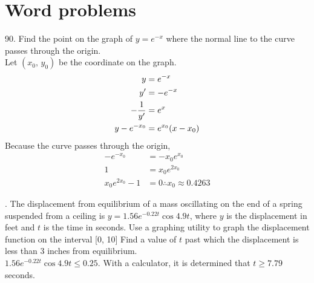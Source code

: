 \documentclass[11pt]{article}
\newcommand*{\vs}{\vspace{1cm}}
\newcommand*{\next}{\noindent}
\newcommand*{\set}{\setcounter{equation}{0}}
\newcommand*{\s}{\section}
\begin{document}
\s{Word problems}
90. Find the point on the graph of $y=e^{-x}$ where the normal line to
the curve passes through the origin.\\
\indent Let $(x_0,\, y_0)$ be the coordinate on the graph.
\begin{align}
    \set
    y&=e^{-x}\\
    y'&=-e^{-x}\\
    -\frac{1}{y'}&=e^x\\
    y-e^{-x_0}&=e^{x_0}(x-x_0)\\
\end{align}
Because the curve passes through the origin,
\begin{align}
    -e^{-x_0}&=-x_0e^{x_0}\\
    1&=x_0e^{2x_0}\\
    x_0e^{2x_0}-1&=0\therefore x_0\approx 0.4263
\end{align}

\vs\next
92. The displacement from equilibrium of a
mass oscillating on the end of a spring suspended from a
ceiling is $y=1.56e^{-0.22t}\cos 4.9t$, where $y$ is the displacement
in feet and $t$ is the time in seconds. Use a graphing utility to
graph the displacement function on the interval [0, 10] Find a
value of $t$ past which the displacement is less than 3 inches from
equilibrium.\\
\indent $1.56e^{-0.22t}\cos 4.9t\leq 0.25$. With a calculator, it is determined that $t\geq 7.79$ seconds.
\end{document}
